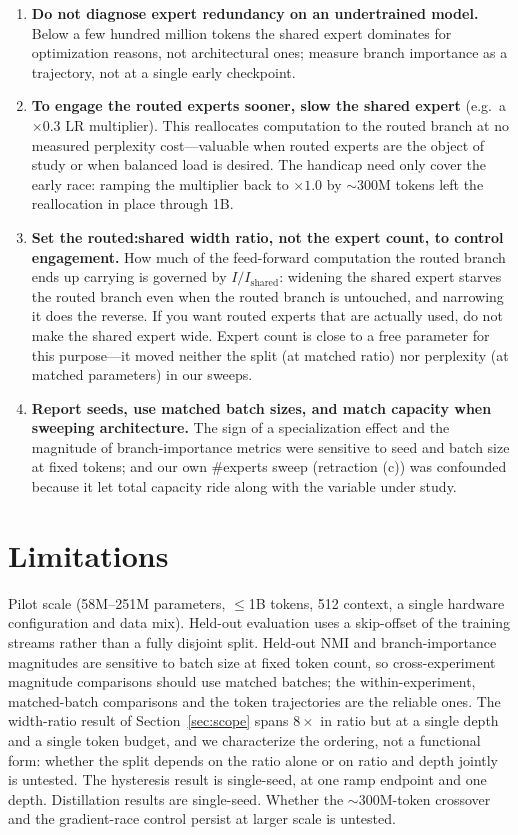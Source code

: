 \documentclass[11pt]{article}
\begin{document}
\begin{enumerate}
  \item \textbf{Do not diagnose expert redundancy on an undertrained model.} Below a few hundred
  million tokens the shared expert dominates for optimization reasons, not architectural ones;
  measure branch importance as a trajectory, not at a single early checkpoint.
  \item \textbf{To engage the routed experts sooner, slow the shared expert} (e.g.\ a $\times0.3$ LR
  multiplier). This reallocates computation to the routed branch at no measured perplexity
  cost---valuable when routed experts are the object of study or when balanced load is desired. The
  handicap need only cover the early race: ramping the multiplier back to $\times1.0$ by
  $\sim$300M tokens left the reallocation in place through 1B.
  \item \textbf{Set the routed:shared width ratio, not the expert count, to control engagement.}
  How much of the feed-forward computation the routed branch ends up carrying is governed by
  $I/I_{\mathrm{shared}}$: widening the shared expert starves the routed branch even when the routed
  branch is untouched, and narrowing it does the reverse. If you want routed experts that are
  actually used, do not make the shared expert wide. Expert count is close to a free parameter for
  this purpose---it moved neither the split (at matched ratio) nor perplexity (at matched
  parameters) in our sweeps.
  \item \textbf{Report seeds, use matched batch sizes, and match capacity when sweeping
  architecture.} The sign of a specialization effect and the magnitude of branch-importance metrics
  were sensitive to seed and batch size at fixed tokens; and our own \#experts sweep (retraction
  (c)) was confounded because it let total capacity ride along with the variable under study.
\end{enumerate}

\section{Limitations}

Pilot scale (58M--251M parameters, $\leq$1B tokens, 512 context, a single hardware configuration and
data mix). Held-out evaluation uses a skip-offset of the training streams rather than a fully
disjoint split. Held-out NMI and branch-importance magnitudes are sensitive to batch size at fixed
token count, so cross-experiment magnitude comparisons should use matched batches; the
within-experiment, matched-batch comparisons and the token trajectories are the reliable ones. The
width-ratio result of Section~\ref{sec:scope} spans $8\times$ in ratio but at a single depth and a
single token budget, and we characterize the ordering, not a functional form: whether the split
depends on the ratio alone or on ratio and depth jointly is untested. The hysteresis result is
single-seed, at one ramp endpoint and one depth. Distillation results are single-seed. Whether the
$\sim$300M-token crossover and the gradient-race control persist at larger scale is untested.
\end{document}
